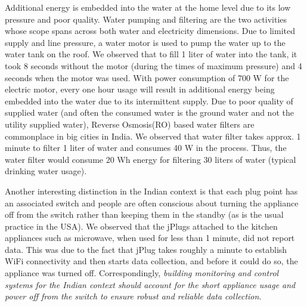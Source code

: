 \documentclass[10pt]{sensys-proc}
\newcommand{\redcolor}[1]{\textcolor{red}{#1}}
\begin{document}
\noindent Additional energy is embedded into the water at the home level due to its low pressure and poor quality. Water pumping and filtering are the two activities whose scope spans across both water and electricity dimensions. Due to limited supply and line pressure, a water motor is used to pump the water up to the water tank on the roof. We observed that to fill 1 liter of water into the tank, it took 8 seconds without the motor (during the times of maximum pressure) and 4 seconds when the motor was used. With power consumption of 700 W for the electric motor, every one hour usage will result in additional energy being embedded into the water due to its intermittent supply. %
Due to poor quality of supplied water (and often the consumed water is the ground water and not the utility supplied water), Reverse Osmosis(RO) based water filters are commonplace in big cities in India. We observed that water filter takes approx. 1 minute to filter 1 liter of water and consumes 40 W in the process. Thus, the water filter would consume 20 Wh energy for filtering 30 liters of water (typical drinking water usage).

\noindent Another interesting distinction in the Indian context is that each plug point has an associated switch and people are often conscious about turning the appliance off from the switch rather than keeping them in the standby (as is the usual practice in the USA). We observed that the jPlugs attached to the kitchen appliances such as microwave, when used for less than 1 minute, did not report data. This was due to the fact that jPlug takes roughly a minute to establish WiFi connectivity and then starts data collection, and before it could do so, the appliance was turned off.
Correspondingly, \emph{building monitoring and control systems for the Indian context should account for the short appliance usage and power off from the switch to ensure robust and reliable data collection.}
\end{document}

